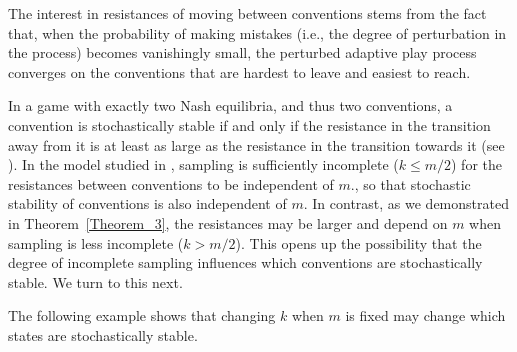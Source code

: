 \bigskip
The interest in resistances of moving between conventions stems from the fact that, when the probability of making mistakes (i.e., the degree of perturbation in the process) becomes vanishingly small, the perturbed adaptive play process converges on the conventions that are hardest to leave and easiest to reach. 
%

%
In a game with exactly two Nash equilibria, and thus two conventions, a convention is stochastically stable if and only if the resistance in the transition away from it is at least as large as the resistance in the transition towards it (see \cite{young1993evolution}).
%
In the model studied in \cite{young1993evolution}, sampling is sufficiently incomplete ($k \leq m/2$) for the resistances between conventions to be independent of $m$., so that stochastic stability of conventions is also independent of $m$. 
%
In contrast, as we demonstrated in Theorem~\ref{Theorem_3}, the resistances may be larger and depend on $m$ when sampling is less incomplete ($k > m/2$). 
This opens up the possibility that the degree of incomplete sampling influences which conventions are stochastically stable. We turn to this next. 



The following example shows that changing $k$ when $m$ is fixed may change which states are stochastically stable.


